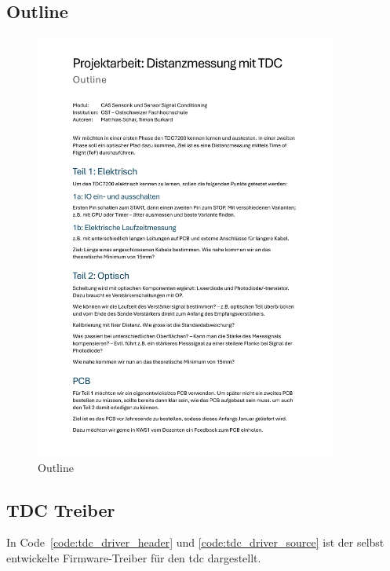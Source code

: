\subsection{Outline}\label{sec:outline}

\begin{figure}[H]
    \centering
    \includegraphics[page=1, width=0.89\textwidth, frame]{attachments/outline.pdf}
    \caption{Outline}\label{fig:outline}
\end{figure}

\subsection{TDC Treiber}\label{sec:tdc_driver}

In Code~\ref{code:tdc_driver_header} und \ref{code:tdc_driver_source} ist der selbst entwickelte Firmware-Treiber für
den \acrshort{tdc} dargestellt.




